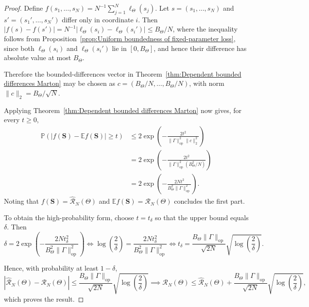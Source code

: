 \begin{proof}
Define
\(
f(s_1,\ldots,s_N)
=
N^{-1}
\sum_{j=1}^N
\ell_\Theta(s_j).
\)
Let \(s=(s_1,\ldots,s_N)\) and \(s'=(s_1',\ldots,s_N')\) differ only in coordinate \(i\). Then
\(
|f(s)-f(s')|
=
N^{-1}
\left|
\ell_\Theta(s_i)-\ell_\Theta(s_i')
\right|
\leqslant{B_\Theta}/{N}
\), where the inequality follows from Proposition~\ref{prop:Uniform boundedness of fixed-parameter loss}, since both \(\ell_\Theta(s_i)\) and \(\ell_\Theta(s_i')\) lie in \([0,B_\Theta]\), and hence their difference has absolute value at most \(B_\Theta\).

Therefore the bounded-differences vector in Theorem~\ref{thm:Dependent bounded differences Marton} may be chosen as \(c=(B_\Theta/N,\ldots,B_\Theta/N)\), with norm \(\|c\|_2
=
{B_\Theta}{/\sqrt N}.
\)

Applying Theorem~\ref{thm:Dependent bounded differences Marton} now gives, for every \(t\geq0\),
\[
\begin{aligned}
\mathbb P
\left(
\left|
f(\mathbf S)-\mathbb Ef(\mathbf S)
\right|
\geq t
\right)
&\leqslant
2\exp
\left(
-\frac{2t^2}
{\|\Gamma\|_{\mathrm{op}}^2\|c\|_2^2}
\right)
\\
&=
2\exp
\left(
-\frac{2t^2}
{\|\Gamma\|_{\mathrm{op}}^2(B_\Theta^2/N)}
\right)
\\
&=
2\exp
\left(
-\frac{2Nt^2}
{B_\Theta^2\|\Gamma\|_{\mathrm{op}}^2}
\right).
\end{aligned}
\]
Noting that \(
f(\mathbf S)=\widehat{\mathcal R}_N(\Theta)\) and 
\(
\mathbb Ef(\mathbf S)=\mathcal R_N(\Theta)
\) concludes the first part.

To obtain the high-probability form, choose \(t=t_\delta\) so that the upper bound equals \(\delta\). Then
\[
\delta
=
2\exp
\left(
-\frac{2Nt_\delta^2}
{B_\Theta^2\|\Gamma\|_{\mathrm{op}}^2}
\right)
\Longleftrightarrow
\log\left(\frac2\delta\right)
=
\frac{2Nt_\delta^2}
{B_\Theta^2\|\Gamma\|_{\mathrm{op}}^2}
\Longleftrightarrow
t_\delta
=
\frac{
B_\Theta\|\Gamma\|_{\mathrm{op}}
}{
\sqrt{2N}
}
\sqrt{
\log\left(\frac2\delta\right)
}.
\]

Hence, with probability at least \(1-\delta\),
\[
\left|
\widehat{\mathcal R}_N(\Theta)
-
\mathcal R_N(\Theta)
\right|
\leqslant
\frac{
B_\Theta\|\Gamma\|_{\mathrm{op}}
}{
\sqrt{2N}
}
\sqrt{
\log\left(\frac2\delta\right)
} \implies
\mathcal R_N(\Theta)
\leqslant
\widehat{\mathcal R}_N(\Theta)
+
\frac{
B_\Theta\|\Gamma\|_{\mathrm{op}}
}{
\sqrt{2N}
}
\sqrt{
\log\left(\frac2\delta\right)
},
\]
which proves the result.
\end{proof}

